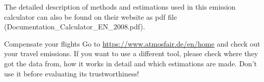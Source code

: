 The detailed description of methods and estimations used in this emission calculator can also be found on their website as pdf file (Documentation\_Calculator\_EN\_2008.pdf). \cite{flight_calc}%

\begin{suggest} {Compensate your flights}
	Go to \url{https://www.atmosfair.de/en/home} and check out your travel emissions. If you want to use a different tool, please check where they got the data from, how it works in detail and which estimations are made. Don't use it before evaluating its trustworthiness!
\end{suggest}
